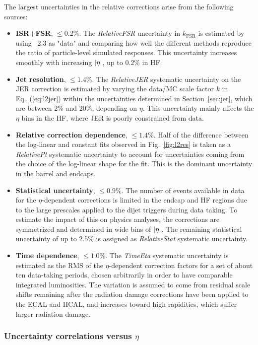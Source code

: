 \documentclass[11pt,twoside,a4paper,cmspaper,final,collab]{cms-tdr}
\begin{document}
The largest uncertainties in the relative corrections arise from the following sources:
\begin{itemize}
\item \textbf{ISR+FSR}, ${\leq} 0.2\%$.
The \textit{RelativeFSR} uncertainty in $k_\mathrm{FSR}$ is estimated by using \HERWIGpp~2.3 as "data" and comparing how well the different methods reproduce the ratio of particle-level simulated responses. This uncertainty increases smoothly with increasing $\lvert \eta \rvert$, up to 0.2\% in HF.
\item \textbf{Jet \pt resolution}, ${\leq} 1.4\%$.
The \textit{RelativeJER} systematic uncertainty on the JER correction is estimated by varying the data/MC scale factor $k$ in Eq.~(\ref{eq:l2jer}) within the uncertainties determined in Section~\ref{sec:jer}, which are between 2\% and 20\%, depending on $\eta$. This uncertainty mainly affects the $\eta$ bins in the HF, where JER is poorly constrained from data.
\item \textbf{Relative correction \pt dependence}, ${\leq} 1.4\%$.
Half of the difference between the log-linear and constant fits observed in Fig.~\ref{fig:l2res} is taken as a \textit{RelativePt} systematic uncertainty to account for uncertainties coming from the choice of the log-linear shape for the fit. This is the dominant uncertainty in the barrel and endcaps.
\item \textbf{Statistical uncertainty}, ${\leq} 0.9\%$.
The number of events available in data for the $\eta$-dependent corrections is limited in the endcap and HF regions due to the large prescales applied to the dijet triggers during data taking.
To estimate the impact of this on physics analyses,
the corrections are symmetrized and determined in wide bins of $\lvert \eta \rvert$. The remaining statistical uncertainty of up to 2.5\% is assigned as \textit{RelativeStat} systematic uncertainty.
\item \textbf{Time dependence}, ${\leq} 1.0\%$.
The \textit{TimeEta} systematic uncertainty is estimated as the RMS of the $\eta$-dependent correction factors for a set of about ten data-taking periods, chosen arbitrarily in order to have comparable integrated luminosities.
The variation is assumed to come from residual scale shifts remaining after the radiation damage corrections have been applied to the ECAL and HCAL, and increases toward high rapidities, which suffer larger radiation damage.
\end{itemize}

\subsubsection*{Uncertainty correlations versus $\eta$}
\end{document}
